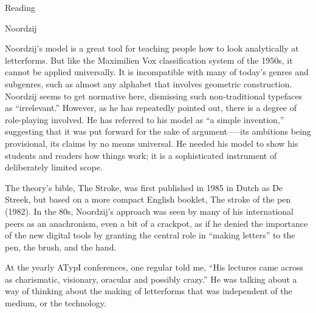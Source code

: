 \documentclass[11pt]{PalisadesLakesBook}
\begin{document}
\begin{plSection}{Reading}
\begin{plSection}{Noordzij}
\begin{plQuote}{}{}
Noordzij's model is a great tool for teaching people 
how to look analytically at letterforms. 
But like the Maximilien Vox classification system of the 1950s, 
it cannot be applied universally. 
It is incompatible with many of today's genres and subgenres, 
such as almost any alphabet that involves geometric construction. 
Noordzij seems to get normative here, 
dismissing such non-traditional typefaces as “irrelevant.” 
However, as he has repeatedly pointed out, 
there is a degree of role-playing involved. 
He has referred to his model as “a simple invention,” 
suggesting that it was put forward for the sake of argument—--its
ambitions being provisional, its claims by no means universal. 
He needed his model to show his students and readers 
how things work; 
it is a sophisticated instrument of deliberately limited scope.
 
The theory's bible, The Stroke, was first published 
in 1985 in Dutch as De Streek, 
but based on a more compact English booklet, 
The stroke of the pen (1982). 
In the 80s, Noordzij's approach was seen 
by many of his international peers as an anachronism, 
even a bit of a crackpot, 
as if he denied the importance of the new digital tools 
by granting the central role in ``making letters''
to the pen, the brush, and the hand.

At the yearly ATypI conferences, one regular told me, 
``His lectures came across 
as charismatic, visionary, oracular and possibly crazy.'' 
He was talking about a way of thinking about 
the making of letterforms 
that was independent of the medium, or the technology.
\end{plQuote}%

\end{plSection}%
\end{plSection}%
\end{document}
